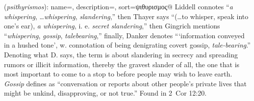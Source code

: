 \item[Gossip,]

(\textit{psithyrismos}):
{
    name=,
    description={},
    sort=ψιθυρισμος@
}
Liddell connotes ``\emph{a whispering}, \ldots \emph{whispering}, \emph{slandering},'' then Thayer says ``(\ldots to whisper, speak into one's ear), \emph{a whispering}, i. e. \emph{secret slandering},'' then Gingrich mentions ``\emph{whispering}, \emph{gossip}, \emph{talebearing},'' finally, Danker denotes ```information conveyed in a hushed tone', w. connotation of being denigrating covert gossip, \emph{tale-bearing}.'' Denoting what D. says, the term is about slandering in secrecy and spreading rumors or illicit information, thereby the gravest slander of all, the one that is most important to come to a stop to before people may wish to leave earth. \emph{Gossip} defines as ``conversation or reports about other people's private lives that might be unkind, disapproving, or not true.''
Found in 2~Cor 12:20.
